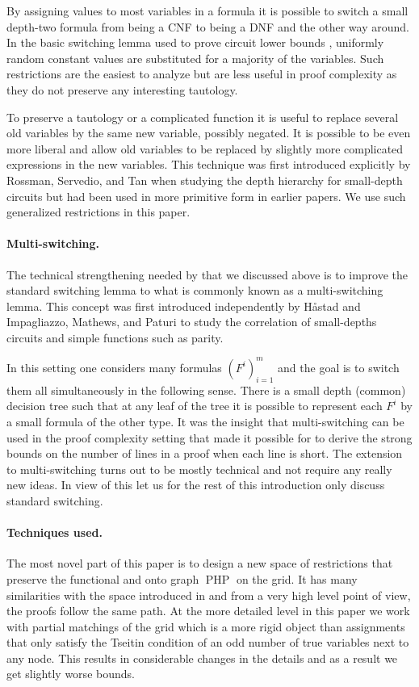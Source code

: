 \documentclass{article}\usepackage[a4paper,margin=20mm]{geometry}
\DeclareMathOperator{\PHP}{PHP}
\begin{document}
By assigning values to most variables in a formula it is
possible to switch a small depth-two formula from being
a CNF to being a DNF and the other way around.
In the basic switching lemma used to prove circuit lower bounds
\cite{fss,yao, jhswitch}, uniformly random constant values 
are substituted
for a majority of the variables.  Such restrictions
are the easiest to analyze but are less useful in 
proof complexity as they do not preserve any interesting tautology.

To preserve a tautology or a complicated
function it is useful to replace several old
variables by the same new variable, possibly negated.
It is possible to be even more liberal and allow 
old variables to be replaced by slightly more complicated
expressions in the new variables.  This technique
was first introduced explicitly by Rossman, Servedio,
and Tan \cite{rst} when studying the depth hierarchy
for small-depth circuits but had been used
in more primitive form in earlier papers.
We use such generalized restrictions in this paper.

\paragraph{Multi-switching.}
The technical strengthening needed by \cite{PRT21} that
we discussed above is to improve the standard switching
lemma to what is commonly
known as a multi-switching lemma.  This concept was first introduced 
independently by H{\aa}stad \cite{jhmultiswitch}
and Impagliazzo, Mathews, and Paturi \cite{imp} to
study the correlation of small-depths circuits and 
simple functions such as parity.

In this setting one considers many formulas $(F^i)_{i=1}^m$
and the goal is to switch them all simultaneously
in the following sense.  There is a small depth (common)
decision tree such that at any leaf of the tree it
is possible to represent each $F^i$ by a small
formula of the other type.
It was the insight that multi-switching
can be used in the proof complexity setting that
made it possible for \cite{PRT21} to derive the
strong bounds on the number of lines in a proof
when each line is short.   The extension to
multi-switching turns out to be mostly technical
and not require any really new ideas.  In view
of this let us for the rest of this introduction
only discuss standard switching.

\paragraph{Techniques used.}
The most novel part of this paper is to design a new space
of restrictions that preserve the functional and
onto graph $\PHP$ on the grid.  It has many similarities
with the space introduced in \cite{jhtseitin}
and from a very high level point of view, the
proofs follow the same path.  At the more detailed
level in this paper we work with partial
matchings of the grid which is a more rigid
object than assignments that only satisfy the 
Tseitin condition of an odd number of true
variables next to any node.  This results
in considerable changes in the details
and as a result we get slightly worse bounds.
\end{document}
